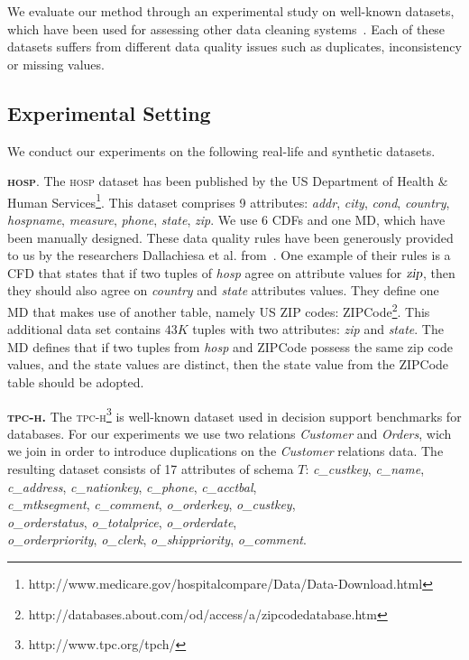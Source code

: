 We evaluate our method through an experimental study on well-known datasets, which have been used for assessing other data cleaning systems~\cite{Dallachiesa:2013:NCD:2463676.2465327, chu2013holistic, llunaticVDLB2013b, bohannon2005cost}. Each of these datasets suffers from different data quality issues such as duplicates, inconsistency or missing values. 

\subsection{Experimental Setting} 
We conduct our experiments on the following real-life and synthetic datasets.


\textbf{\textsc{hosp}}. The \textsc{hosp} dataset has been published by the US Department of Health $\&$ Human Services\footnote{http://www.medicare.gov/hospitalcompare/Data/Data-Download.html}. This dataset comprises 9 attributes: \textsl{addr}, \textsl{city}, \textsl{cond}, \textsl{country}, \textsl{hospname}, \textsl{measure}, \textsl{phone}, \textsl{state}, \textsl{zip}. 
We use 6 CDFs and one MD, which have been manually designed. These data quality rules have been generously provided to us by the researchers Dallachiesa et al. from~\cite{Dallachiesa:2013:NCD:2463676.2465327}. One example of their rules is a CFD that states that if two tuples of \textsl{hosp} agree on attribute values for $\textsl{zip}$, then they should also agree on \textsl{country} and \textsl{state} attributes values. They define one MD that makes use of another table, namely US ZIP codes: ZIPCode\footnote{http://databases.about.com/od/access/a/zipcodedatabase.htm}. This additional data set contains $43K$ tuples with two attributes: \textsl{zip} and \textsl{state}. The MD defines that if two tuples from \textsl{hosp} and ZIPCode possess the same zip code values, and the state values are distinct, then the state value from the ZIPCode table should be adopted. 

\textbf{\textsc{tpc-h}.} The \textsc{tpc-h}\footnote{http://www.tpc.org/tpch/} is well-known dataset used in decision support benchmarks for databases. For our experiments we use two relations \textit{Customer} and \textit{Orders}, wich we join in order to introduce duplications on the \textit{Customer} relations data. The resulting dataset consists of 17 attributes of schema $T$: \textsl{c\_custkey}, \textsl{c\_name}, \textsl{c\_address},  \textsl{c\_nationkey}, \textsl{c\_phone}, \textsl{c\_acctbal},\\ \textsl{c\_mtksegment}, \textsl{c\_comment}, \textsl{o\_orderkey}, \textsl{o\_custkey},\\ \textsl{o\_orderstatus}, \textsl{o\_totalprice}, \textsl{o\_orderdate},\\ \textsl{o\_orderpriority}, \textsl{o\_clerk}, \textsl{o\_shippriority}, \textsl{o\_comment}. 

